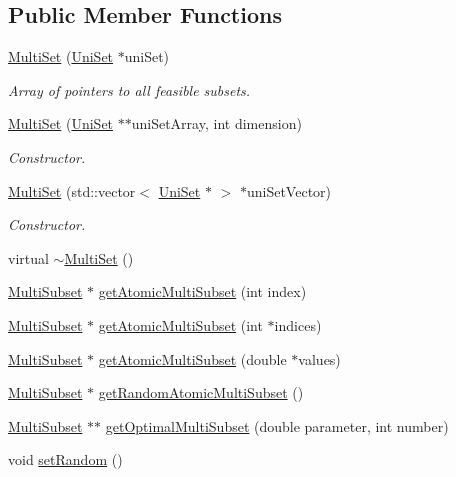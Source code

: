 \subsection*{Public Member Functions}
\begin{DoxyCompactItemize}
\item 
\hyperlink{classMultiSet_aa6ec2e2e6ef524acde12c795629f08c8}{Multi\-Set} (\hyperlink{classUniSet}{Uni\-Set} $\ast$uni\-Set)
\begin{DoxyCompactList}\small\item\em Array of pointers to all feasible subsets. \end{DoxyCompactList}\item 
\hyperlink{classMultiSet_abafc2f4fb50484d3aabdd744dc1d6cc5}{Multi\-Set} (\hyperlink{classUniSet}{Uni\-Set} $\ast$$\ast$uni\-Set\-Array, int dimension)
\begin{DoxyCompactList}\small\item\em Constructor. \end{DoxyCompactList}\item 
\hyperlink{classMultiSet_ace92943f7461b6f683c7c4da76408e73}{Multi\-Set} (std\-::vector$<$ \hyperlink{classUniSet}{Uni\-Set} $\ast$ $>$ $\ast$uni\-Set\-Vector)
\begin{DoxyCompactList}\small\item\em Constructor. \end{DoxyCompactList}\item 
virtual \hyperlink{classMultiSet_a3ad638b1613083b97a53ea58e9060a4d}{$\sim$\-Multi\-Set} ()
\item 
\hyperlink{classMultiSubset}{Multi\-Subset} $\ast$ \hyperlink{classMultiSet_a48a6504163110d377db974d6ea5bd8fe}{get\-Atomic\-Multi\-Subset} (int index)
\item 
\hyperlink{classMultiSubset}{Multi\-Subset} $\ast$ \hyperlink{classMultiSet_a91d471ce84161187ab63f56199c74ab3}{get\-Atomic\-Multi\-Subset} (int $\ast$indices)
\item 
\hyperlink{classMultiSubset}{Multi\-Subset} $\ast$ \hyperlink{classMultiSet_aee151d663695e02987e8b515bd511e67}{get\-Atomic\-Multi\-Subset} (double $\ast$values)
\item 
\hyperlink{classMultiSubset}{Multi\-Subset} $\ast$ \hyperlink{classMultiSet_afe3111c90692136b5141a4c5b96e2da3}{get\-Random\-Atomic\-Multi\-Subset} ()
\item 
\hyperlink{classMultiSubset}{Multi\-Subset} $\ast$$\ast$ \hyperlink{classMultiSet_aabac7439b455032f959bb6ce9d145f7e}{get\-Optimal\-Multi\-Subset} (double parameter, int number)
\item 
\hypertarget{classMultiSet_aac2d5ee0afa30a8f565f29204a677cd9}{void \hyperlink{classMultiSet_aac2d5ee0afa30a8f565f29204a677cd9}{set\-Random} ()}\label{classMultiSet_aac2d5ee0afa30a8f565f29204a677cd9}


\end{DoxyCompactItemize}
